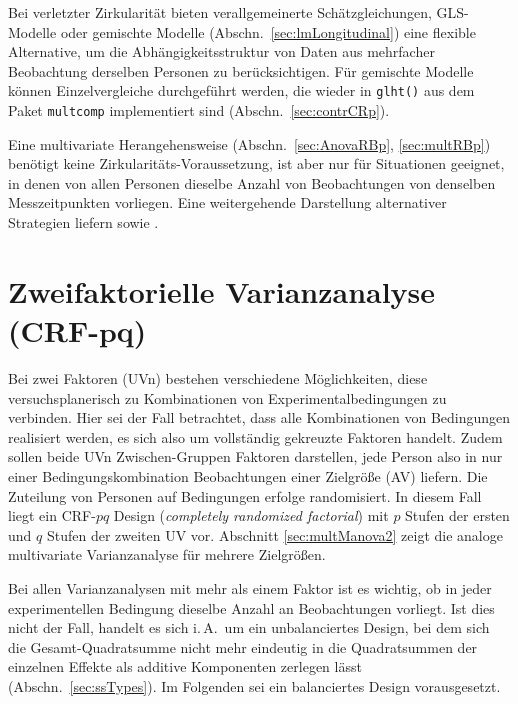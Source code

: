 Bei verletzter Zirkularität bieten verallgemeinerte Schätzgleichungen, GLS-Modelle oder gemischte Modelle (Abschn.\ \ref{sec:lmLongitudinal}) eine flexible Alternative, um die Abhängigkeitsstruktur von Daten aus mehrfacher Beobachtung derselben Personen zu berücksichtigen. Für gemischte Modelle können Einzelvergleiche durchgeführt werden, die wieder in \lstinline!glht()! aus dem Paket \lstinline!multcomp! implementiert sind (Abschn.\ \ref{sec:contrCRp}).

Eine multivariate Herangehensweise (Abschn.\ \ref{sec:AnovaRBp}, \ref{sec:multRBp}) benötigt keine Zirkularitäts-Voraussetzung, ist aber nur für Situationen geeignet, in denen von allen Personen dieselbe Anzahl von Beobachtungen von denselben Messzeitpunkten vorliegen. Eine weitergehende Darstellung alternativer Strategien liefern  sowie .

\section[Zweifaktorielle Varianzanalyse (CRF-\texorpdfstring{$pq$}{pq})]{Zweifaktorielle Varianzanalyse (CRF-$\bm{pq}$)}
\label{sec:CRFpq}

Bei zwei Faktoren (UVn) bestehen verschiedene Möglichkeiten, diese versuchsplanerisch zu Kombinationen von Experimentalbedingungen zu verbinden. Hier sei der Fall betrachtet, dass alle Kombinationen von Bedingungen realisiert werden, es sich also um vollständig gekreuzte Faktoren handelt. Zudem sollen beide UVn Zwischen-Gruppen Faktoren darstellen, jede Person also in nur einer Bedingungskombination Beobachtungen einer Zielgröße (AV) liefern. Die Zuteilung von Personen auf Bedingungen erfolge randomisiert. In diesem Fall liegt ein CRF-$pq$ Design (\emph{completely randomized factorial}) mit $p$ Stufen der ersten und $q$ Stufen der zweiten UV vor. Abschnitt \ref{sec:multManova2} zeigt die analoge multivariate Varianzanalyse für mehrere Zielgrößen.

Bei allen Varianzanalysen mit mehr als einem Faktor ist es wichtig, ob in jeder experimentellen Bedingung dieselbe Anzahl an Beobachtungen vorliegt. Ist dies nicht der Fall, handelt es sich i.\,A.\ um ein unbalanciertes Design, bei dem sich die Gesamt-Quadratsumme nicht mehr eindeutig in die Quadratsummen der einzelnen Effekte als additive Komponenten zerlegen lässt (Abschn.\ \ref{sec:ssTypes}). Im Folgenden sei ein balanciertes Design vorausgesetzt.

